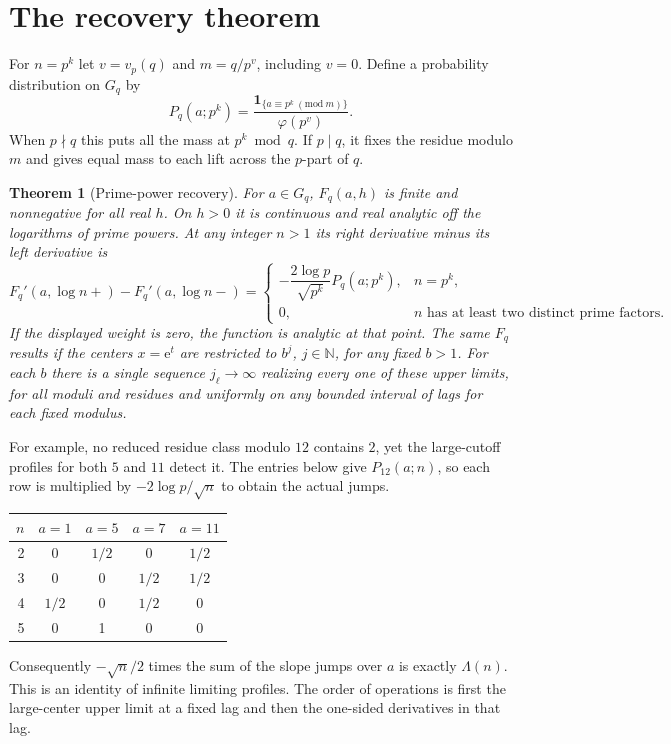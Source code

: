 \documentclass[11pt]{article}
\newtheorem{theorem}{Theorem}
\newcommand{\one}{\mathbf 1}
\newcommand{\e}{\mathrm e}
\begin{document}
\section{The recovery theorem}
For $n=p^k$ let $v=v_p(q)$ and $m=q/p^v$, including $v=0$. Define a probability distribution on $G_q$ by
\begin{equation}
 P_q(a;p^k)=\frac{\one_{\{a\equiv p^k\ (\mathrm{mod}\ m)\}}}{\varphi(p^v)} .       \label{eq:P}
\end{equation}
When $p\nmid q$ this puts all the mass at $p^k\bmod q$. If $p\mid q$, it fixes the residue modulo $m$ and gives equal mass to each lift across the $p$-part of $q$.

\begin{theorem}[Prime-power recovery]\label{th:main}
For $a\in G_q$, $F_q(a,h)$ is finite and nonnegative for all real $h$. On $h>0$ it is continuous and real analytic off the logarithms of prime powers. At any integer $n>1$ its right derivative minus its left derivative is
\begin{equation}
 F_q'(a,\log n+)-F_q'(a,\log n-)=
 \begin{cases}
 -\dfrac{2\log p}{\sqrt{p^k}}P_q(a;p^k),&n=p^k,\\[4pt]
 0,& n\text{ has at least two distinct prime factors}.
 \end{cases}                                                   \label{eq:jump}
\end{equation}
If the displayed weight is zero, the function is analytic at that point. The same $F_q$ results if the centers $x=\e^t$ are restricted to $b^j$, $j\in\mathbb N$, for any fixed $b>1$. For each $b$ there is a single sequence $j_\ell\to\infty$ realizing every one of these upper limits, for all moduli and residues and uniformly on any bounded interval of lags for each fixed modulus.
\end{theorem}

For example, no reduced residue class modulo $12$ contains $2$, yet the large-cutoff profiles for both $5$ and $11$ detect it. The entries below give $P_{12}(a;n)$, so each row is multiplied by $-2\log p/\sqrt n$ to obtain the actual jumps.
\begin{center}
\begin{tabular}{rcccc}
\toprule
$n$ & $a=1$ & $a=5$ & $a=7$ & $a=11$\\
\midrule
2 & 0 & $1/2$ & 0 & $1/2$\\
3 & 0 & 0 & $1/2$ & $1/2$\\
4 & $1/2$ & 0 & $1/2$ & 0\\
5 & 0 & 1 & 0 & 0\\
\bottomrule
\end{tabular}
\end{center}
Consequently $-\sqrt n/2$ times the sum of the slope jumps over $a$ is exactly $\Lambda(n)$. This is an identity of infinite limiting profiles. The order of operations is first the large-center upper limit at a fixed lag and then the one-sided derivatives in that lag.
\end{document}
